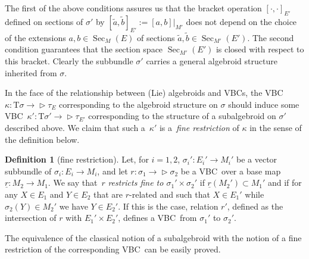 \documentclass[pdftex]{sigma}
\newcommand{\ZM}{{VBC}} %
\newcommand{\wt}[1]{\widetilde{#1}} %
\newcommand{\und}{\underline}
\newcommand{\Sec}{\operatorname{Sec}}
\newcommand{\ra}{\rightarrow}
\newcommand{\T}{\mathrm{T}} %
\def\relto{\rightarrow\!\!\vartriangleright} %
\numberwithin{equation}{section}
\theoremstyle{definition}
\newtheorem{df}[thm]{Definition}
\begin{document}
The first of the above conditions assures us that the bracket operation $[\cdot, \cdot]_{E'}$ defined on sections of $\sigma'$ by $[\wt{a}, \wt{b}]_{E'}:= [a, b]|_{M'}$ does not depend on the choice of the extensions $a,b\in \Sec_M(E)$ of sections $\wt{a},\wt{b}\in\Sec_{M'}(E')$. The second condition guarantees that the section space $\Sec_{M'}(E')$ is closed with respect to this bracket.
Clearly the subbundle $\sigma'$ carries a general algebroid structure inherited from $\sigma$.

In the face of the relationship between (Lie) algebroids and \ZM s, the \ZM\ \mbox{$\kappa\colon \T\sigma\!\relto \!\tau_E$} corresponding to the algebroid structure on $\sigma$ should induce some \ZM\ $\kappa'\colon \T\sigma'\relto \tau_{E'}$ corresponding to the structure of a subalgebroid on $\sigma'$ described above. We claim that such a~$\kappa'$ is a~\emph{fine restriction} of $\kappa$ in the sense of the definition below.

\begin{df}[fine restriction] Let, for $i=1,2$, $\sigma_i'\colon E_i'\ra M_i'$ be a vector subbundle of $\sigma_i\colon E_i\ra M_i$, and let $r\colon \sigma_1\relto \sigma_2$ be a \ZM\ over a base map $\und{r}\colon M_2\ra M_1$. We say that~$r$ \emph{restricts fine to $\sigma_1'\times \sigma_2'$} if $\und{r}(M_2')\subset M_1'$ and if for any $X\in E_1$ and $Y\in E_2$ that are $r$-related and such that $X\in E_1'$ while $\sigma_2(Y)\in M_2'$ we have $Y\in E_2'$. If this is the case, relation $r'$, defined as the intersection of $r$ with $E_1'\times E_2'$, defines a \ZM\ from $\sigma_1'$ to $\sigma_2'$.
\end{df}

The equivalence of the classical notion of a subalgebroid with the notion of a fine restriction of the corresponding \ZM\ can be easily proved.
\end{document}
